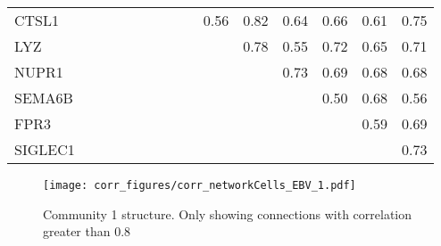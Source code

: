 \begin{longtable}{lrrrrrrrrrrrrrr}
CTSL1    &            &            &              &          &              &                &                &             &      0.56 &        0.82 &         0.64 &       0.66 &          0.61 &       0.75 \\
LYZ      &            &            &              &          &              &                &                &             &           &        0.78 &         0.55 &       0.72 &          0.65 &       0.71 \\
NUPR1    &            &            &              &          &              &                &                &             &           &             &         0.73 &       0.69 &          0.68 &       0.68 \\
SEMA6B   &            &            &              &          &              &                &                &             &           &             &              &       0.50 &          0.68 &       0.56 \\
FPR3     &            &            &              &          &              &                &                &             &           &             &              &            &          0.59 &       0.69 \\
SIGLEC1  &            &            &              &          &              &                &                &             &           &             &              &            &               &       0.73 \\
\end{longtable}


\begin{figure}[h!]
\centering
\texttt{[image: corr\_figures/corr\_networkCells\_EBV\_1.pdf]}
\caption{Community 1 structure. Only showing connections with correlation greater than 0.8}
\end{figure}




